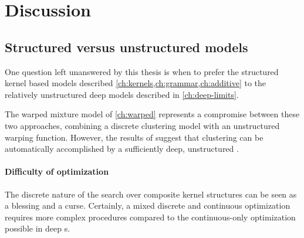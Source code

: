 
\inbpdocument

\chapter{Discussion}
\label{ch:discussion}









\section{Structured versus unstructured models}

One question left unanswered by this thesis is when to prefer the structured kernel based models described \cref{ch:kernels,ch:grammar,ch:additive} to the relatively unstructured deep \gp{} models described in \cref{ch:deep-limits}.

The warped mixture model of \cref{ch:warped} represents a compromise between these two approaches, combining a discrete clustering model with an unstructured warping function.
However, the results of \citet{damianou2012deep} suggest that clustering can be automatically accomplished by a sufficiently deep, unstructured \gp{}.

\subsubsection{Difficulty of optimization}
The discrete nature of the search over composite kernel structures can be seen as a blessing and a curse.
Certainly, a mixed discrete and continuous optimization requires more complex procedures compared to the continuous-only optimization possible in deep \gp{}s.

